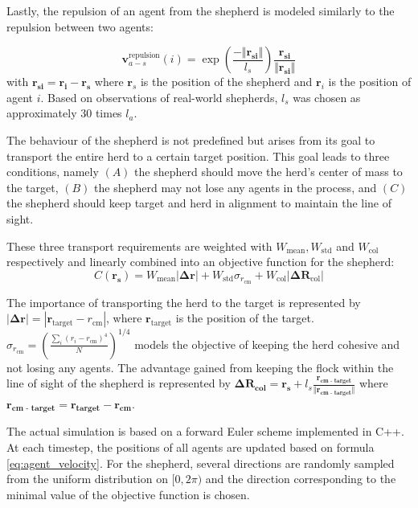 Lastly, the repulsion of an agent from the shepherd is modeled similarly to the repulsion between two agents:

$$\boldsymbol{v}^\text{repulsion}_{a-s}(i) = \exp\left(\frac{-\Vert\boldsymbol{r_{si}}\Vert}{l_s}\right)\frac{\boldsymbol{r_{si}}}{\Vert\boldsymbol{r_{si}}\Vert}$$
with $\boldsymbol{r_{si}}=\boldsymbol{r_i} - \boldsymbol{r_s}$ where $\boldsymbol{r}_s$ is the position of the shepherd and $\boldsymbol{r}_i$ is the position of agent $i$. Based on observations of real-world shepherds, $l_s$ was chosen as approximately 30 times $l_a$.

The behaviour of the shepherd is not predefined but arises from its goal to transport the entire herd to a certain target position. This goal leads to three conditions, namely $(A)$ the shepherd should move the herd's center of mass to the target, $(B)$ the shepherd may not lose any agents in the process, and $(C)$ the shepherd should keep target and herd in alignment to maintain the line of sight.

These three transport requirements are weighted with $W_\text{mean}, W_\text{std}$ and $W_\text{col}$ respectively and linearly combined into an objective function for the shepherd:
\begin{equation}
\label{eq:objective_function}
    C(\boldsymbol{r_s}) = W_\text{mean}|\boldsymbol{\Delta r}| + W_\text{std} \sigma_{r_\text{cm}} + W_\text{col} |\boldsymbol{\Delta R}_\text{col}|
\end{equation}

The importance of transporting the herd to the target is represented by $|\boldsymbol{\Delta r}| = |\boldsymbol{r}_\text{target} - r_\text{cm}|$, where $\boldsymbol{r}_\text{target}$ is the position of the target. $\sigma_{r_\text{cm}} = \left(\frac{\sum_i(r_i - r_\text{cm})^4}{N}\right)^{1/4}$ models the objective of keeping the herd cohesive and not losing any agents. The advantage gained from keeping the flock within the line of sight of the shepherd is represented by $\boldsymbol{\Delta R_\text{col}} = \boldsymbol{r_s} + l_s \frac{\boldsymbol{r_\text{cm - target}}}{\Vert \boldsymbol{r_\text{cm - target}} \Vert}$ where $\boldsymbol{r_\text{cm - target}} = \boldsymbol{r_\text{target}} - \boldsymbol{r_\text{cm}}$.

The actual simulation is based on a forward Euler scheme implemented in C++. At each timestep, the positions of all agents are updated based on formula \ref{eq:agent_velocity}. For the shepherd, several directions are randomly sampled from the uniform distribution on $[0, 2\pi)$ and the direction corresponding to the minimal value of the objective function is chosen. 

